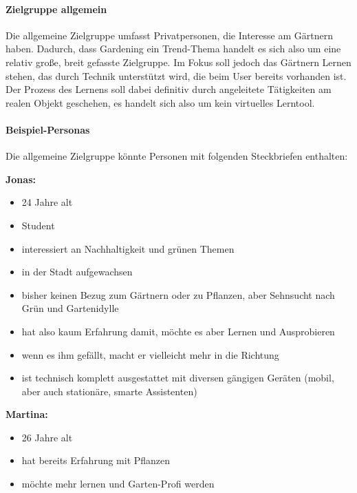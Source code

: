 \hypertarget{zielgruppe-allgemein}{%
\paragraph{Zielgruppe allgemein}\label{zielgruppe-allgemein}}

Die allgemeine Zielgruppe umfasst Privatpersonen, die Interesse am
Gärtnern haben. Dadurch, dass Gardening ein Trend-Thema handelt es sich
also um eine relativ große, breit gefasste Zielgruppe. Im Fokus soll
jedoch das Gärtnern Lernen stehen, das durch Technik unterstützt wird,
die beim User bereits vorhanden ist. Der Prozess des Lernens soll dabei
definitiv durch angeleitete Tätigkeiten am realen Objekt geschehen, es
handelt sich also um kein virtuelles Lerntool.

\hypertarget{beispiel-personas}{%
\paragraph{Beispiel-Personas}\label{beispiel-personas}}

Die allgemeine Zielgruppe könnte Personen mit folgenden Steckbriefen
enthalten:

\textbf{Jonas:}

\begin{itemize}
\tightlist
\item
  24 Jahre alt
\item
  Student
\item
  interessiert an Nachhaltigkeit und grünen Themen
\item
  in der Stadt aufgewachsen
\item
  bisher keinen Bezug zum Gärtnern oder zu Pflanzen, aber Sehnsucht nach
  Grün und Gartenidylle
\item
  hat also kaum Erfahrung damit, möchte es aber Lernen und Ausprobieren
\item
  wenn es ihm gefällt, macht er vielleicht mehr in die Richtung
\item
  ist technisch komplett ausgestattet mit diversen gängigen Geräten
  (mobil, aber auch stationäre, smarte Assistenten)
\end{itemize}

\textbf{Martina:}

\begin{itemize}
\tightlist
\item
  26 Jahre alt
\item
  hat bereits Erfahrung mit Pflanzen
\item
  möchte mehr lernen und Garten-Profi werden
\end{itemize}

